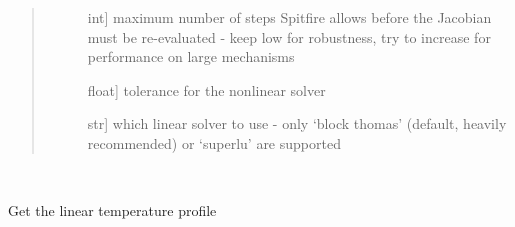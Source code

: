 \documentclass[letterpaper,10pt,english]{sphinxmanual}
\begin{document}
\begin{fulllineitems}
\begin{fulllineitems}
\begin{quote}
\begin{description}
\begin{description}
\item[{}] \leavevmode{[}int{]}
maximum number of steps Spitfire allows before the Jacobian must be re-evaluated - keep low for robustness, try to increase for performance on large mechanisms

\item[{}] \leavevmode{[}float{]}
tolerance for the nonlinear solver

\item[{}] \leavevmode{[}str{]}
which linear solver to use - only ‘block thomas’ (default, heavily recommended) or ‘superlu’ are supported

\end{description}

\end{description}\end{quote}

\end{fulllineitems}


\begin{fulllineitems}
\label{\detokenize{spitfire.chemistry.flamelet:spitfire.chemistry.flamelet.Flamelet.iteration_count}}~
\end{fulllineitems}


\begin{fulllineitems}
\label{\detokenize{spitfire.chemistry.flamelet:spitfire.chemistry.flamelet.Flamelet.linear_temperature}}
Get the linear temperature profile

\end{fulllineitems}


\begin{fulllineitems}
\label{\detokenize{spitfire.chemistry.flamelet:spitfire.chemistry.flamelet.Flamelet.mechanism}}~
\end{fulllineitems}


\end{fulllineitems}
\end{document}
